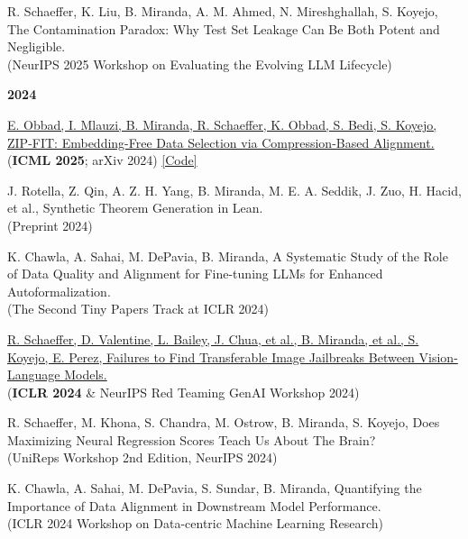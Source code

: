 \documentclass{article}
\newenvironment{changemargin}[2]{%
  \begin{list}{}{%
    \setlength{\topsep}{0pt}%
    \setlength{\leftmargin}{#1}%
    \setlength{\rightmargin}{#2}%
    \setlength{\listparindent}{\parindent}%
    \setlength{\itemindent}{\parindent}%
    \setlength{\parsep}{\parskip}%
  }%
  \item[]}{\end{list}
}
\newenvironment{body} {
	\vspace*{-16pt}
	\begin{changemargin}{-0.25in}{-0.5in}
  }	
	{\end{changemargin}
}
\begin{document}
\begin{body}
    \vspace{10pt}
    {R. Schaeffer, K. Liu, B. Miranda, A. M. Ahmed, N. Mireshghallah, S. Koyejo,
    The Contamination Paradox: Why Test Set Leakage Can Be Both Potent and Negligible.}
    \\
    (NeurIPS 2025 Workshop on Evaluating the Evolving LLM Lifecycle)

    \vspace{12pt}
    \textbf{\large 2024}
    \vspace{4pt}

    \vspace{10pt}
    \href{https://arxiv.org/abs/2410.18194}
    {E. Obbad, I. Mlauzi, B. Miranda, R. Schaeffer, K. Obbad, S. Bedi, S. Koyejo,
    ZIP-FIT: Embedding-Free Data Selection via Compression-Based Alignment.}
    \\
    (\textbf{ICML 2025}; arXiv 2024) \href{https://github.com/stair-lab/ZIP-FIT}{[Code]}

    \vspace{10pt}
    {J. Rotella, Z. Qin, A. Z. H. Yang, B. Miranda, M. E. A. Seddik, J. Zuo, H. Hacid, et al.,
    Synthetic Theorem Generation in Lean.}
    \\
    (Preprint 2024)

    \vspace{10pt}
    {K. Chawla, A. Sahai, M. DePavia, B. Miranda,
    A Systematic Study of the Role of Data Quality and Alignment for Fine-tuning LLMs for Enhanced Autoformalization.}
    \\
    (The Second Tiny Papers Track at ICLR 2024)

    \vspace{10pt}
    \href{https://openreview.net/forum?id=wvFnqVVUhN}
    {R. Schaeffer, D. Valentine, L. Bailey, J. Chua, et al., B. Miranda, et al., S. Koyejo, E. Perez,
    Failures to Find Transferable Image Jailbreaks Between Vision-Language Models.}
    \\
    (\textbf{ICLR 2024} \& NeurIPS Red Teaming GenAI Workshop 2024)

    \vspace{10pt}
    {R. Schaeffer, M. Khona, S. Chandra, M. Ostrow, B. Miranda, S. Koyejo,
    Does Maximizing Neural Regression Scores Teach Us About The Brain?}
    \\
    (UniReps Workshop 2nd Edition, NeurIPS 2024)

    \vspace{10pt}
    {K. Chawla, A. Sahai, M. DePavia, S. Sundar, B. Miranda,
    Quantifying the Importance of Data Alignment in Downstream Model Performance.}
    \\
    (ICLR 2024 Workshop on Data-centric Machine Learning Research)


\end{body}
\end{document}
